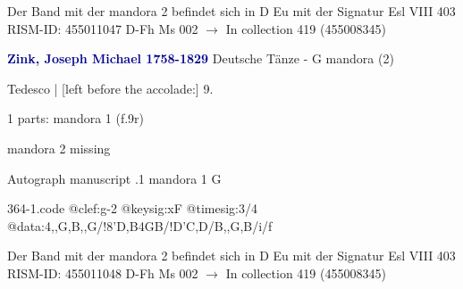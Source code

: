 \documentclass[twocolumn]{book}
\begin{document}
\newline Der Band mit der mandora 2 befindet sich in D Eu mit der Signatur Esl VIII 403
\newline RISM-ID: 455011047
\newline D-Fh  Ms 002
\newline $\rightarrow$ In collection 419 (455008345)
      
\newline \par \vspace{7pt} \textcolor{darkblue}{\textbf{Zink, Joseph Michael  1758-1829}}
\newline Deutsche Tänze - G
\newline mandora (2)
\newline \begin{itshape}[f.9r, at left:] Tedesco | [left before the accolade:] 9.\end{itshape} 
\newline \textcolor{darkblue}{}  1 parts: mandora 1  (f.9r)
\newline \begin{small} mandora 2 missing\end{small} 
\newline Autograph manuscript
.1  mandora 1  G  
\begin{filecontents*}{364-1.code}
@clef:g-2
@keysig:xF
@timesig:3/4
@data:4,,G,B,,G/!8'D,B4GB/!D'C,D/B,,G,B/i/f
\end{filecontents*}
\newline
%

\newline Der Band mit der mandora 2 befindet sich in D Eu mit der Signatur Esl VIII 403
\newline RISM-ID: 455011048
\newline D-Fh  Ms 002
\newline $\rightarrow$ In collection 419 (455008345)
      
\end{document}
